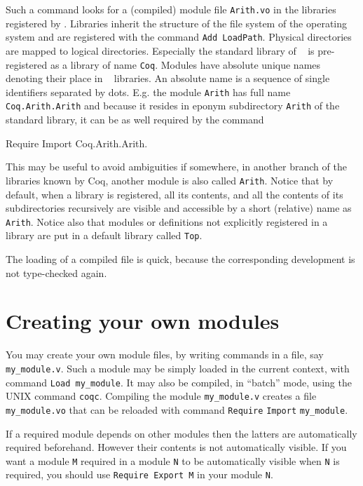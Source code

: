 \documentclass[11pt,a4paper]{book}
\begin{document}
Such a command looks for a (compiled) module file \verb:Arith.vo: in
the libraries registered by \Coq. Libraries inherit the structure of
the file system of the operating system and are registered with the
command \verb:Add LoadPath:. Physical directories are mapped to
logical directories. Especially the standard library of \Coq~ is
pre-registered as a library of name \verb=Coq=.  Modules have absolute
unique names denoting their place in \Coq~ libraries.  An absolute
name is a sequence of single identifiers separated by dots.  E.g. the
module \verb=Arith= has full name \verb=Coq.Arith.Arith= and because
it resides in eponym subdirectory \verb=Arith= of the standard
library, it can be as well required by the command

\begin{coq_example*}
Require Import Coq.Arith.Arith.
\end{coq_example*}

This may be useful to avoid ambiguities if somewhere, in another branch
of the libraries known by Coq, another module is also called
\verb=Arith=. Notice that by default, when a library is registered,
all its contents, and all the contents of its subdirectories recursively are
visible and accessible by a short (relative) name as \verb=Arith=.
Notice also that modules or definitions not explicitly registered in
a library are put in a default library called \verb=Top=.

The loading of a compiled file is quick, because the corresponding
development is not type-checked again. 

\section{Creating your own modules}

You may create your own module files, by writing {\Coq} commands in a file,
say \verb:my_module.v:. Such a module may be simply loaded in the current
context, with command \verb:Load my_module:. It may also be compiled,
in ``batch'' mode, using the UNIX command
\verb:coqc:. Compiling the module \verb:my_module.v: creates a 
file \verb:my_module.vo:{} that can be reloaded with command
\verb:Require: \verb:Import: \verb:my_module:. 

If a required module depends on other modules then the latters are
automatically required beforehand. However their contents is not
automatically visible.  If you want a module \verb=M= required in a
module \verb=N= to be automatically visible when \verb=N= is required,
you should use \verb:Require Export M: in your module \verb:N:.
\end{document}
